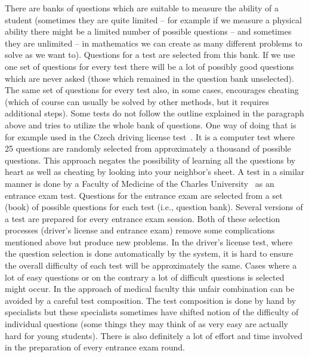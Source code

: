 There are banks of questions which are suitable to measure the ability of a student (sometimes they are quite limited – for example if we measure a physical ability there might be a limited number of possible questions – and sometimes they are unlimited – in mathematics we can create as many different problems to solve as we want to). Questions for a test are selected from this bank. If we use one set of questions for every test there will be a lot of possibly good questions which are never asked (those which remained in the question bank unselected). The same set of questions for every test also, in some cases, encourages cheating (which of course can usually be solved by other methods, but it requires additional steps). Some tests do not follow the outline explained in the paragraph above and tries to utilize the whole bank of questions. One way of doing that is for example used in the Czech driving license test~\cite{Dopravy2006}. It is a computer test where 25 questions are randomly selected from approximately a thousand of possible questions. This approach negates the possibility of learning all the questions by heart as well as cheating by looking into your neighbor’s sheet. A test in a similar manner is done by a Faculty of Medicine of the Charles University~\cite{UK} as an entrance exam test. Questions for the entrance exam are selected from a set (book) of possible questions for each test (i.e., question bank). Several versions of a test are prepared for every entrance exam session. Both of these selection processes (driver’s license and entrance exam) remove some complications mentioned above but produce new problems. In the driver’s license test, where the question selection is done automatically by the system, it is hard to ensure the overall difficulty of each test will be approximately the same. Cases where a lot of easy questions or on the contrary a lot of difficult questions is selected might occur. In the approach of medical faculty this unfair combination can be avoided by a careful test composition. The test composition is done by hand by specialists but these specialists sometimes have shifted notion of the difficulty of individual questions (some things they may think of as very easy are actually hard for young students). There is also definitely a lot of effort and time involved in the preparation of every entrance exam round.

